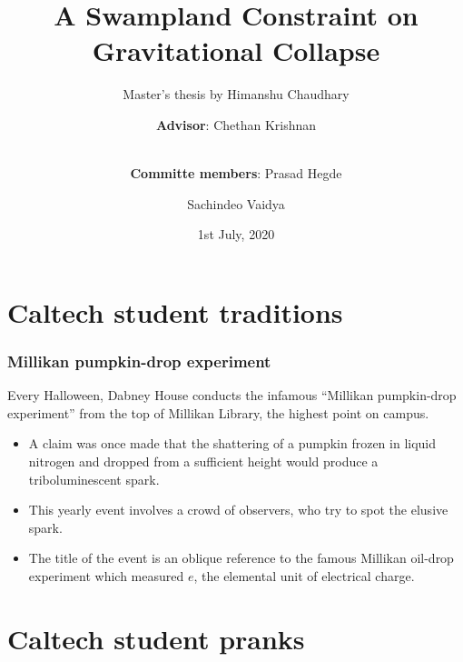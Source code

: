 \documentclass[hyperref={bookmarks=false},aspectratio=169]{beamer}
\title[A Swampland Constraint on Gravitational Collapse]
{\bfseries{A Swampland Constraint on Gravitational Collapse}}
\subtitle{Master's thesis by Himanshu Chaudhary}
\author[Himanshu Chaudhary]
{\textbf{Advisor}: Chethan Krishnan\inst{1}
\and \\
\textbf{Committe members}:
Prasad Hegde\inst{1} \and Sachindeo Vaidya\inst{1}
}
\institute[IISc]
{
  \inst{1}
  Center for High Energy Physics\\
  Indian Institute of Science
}
\date[IISc, 2020]
{1st July, 2020}
\begin{document}
\frame{\titlepage}  %



\section{Caltech student traditions}

\begin{frame}
  \frametitle{Millikan pumpkin-drop experiment}
  Every Halloween, Dabney House conducts the infamous ``Millikan pumpkin-drop experiment'' from the top of Millikan Library, the highest point on campus.

  \begin{itemize}
    \item<1-> A claim was once made that the shattering of a pumpkin frozen in liquid nitrogen and dropped from a sufficient height would produce a triboluminescent spark.
    \item<2-> This yearly event involves a crowd of observers, who try to spot the elusive spark.
    \item<3-> The title of the event is an oblique reference to the famous Millikan oil-drop experiment which measured $e$, the elemental unit of electrical charge.
  \end{itemize}

\end{frame}



%
%

\section{Caltech student pranks}
\end{document}
